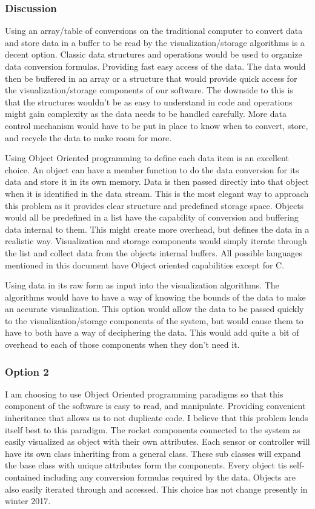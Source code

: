 \documentclass[10pt,draftclsnofoot,onecolumn]{IEEEtran}
\begin{document}
\subsubsection{Discussion}
Using an array/table of conversions on the traditional computer to convert data and store data in a buffer to be read by the visualization/storage algorithms is a decent option. Classic data structures and operations would be used to organize data conversion formulas. Providing fast easy access of the data. The data would then be buffered in an array or a structure that would provide quick access for the visualization/storage components of our software. The downside to this is that the structures wouldn't be as easy to understand in code and operations might gain complexity as the data needs to be handled carefully. More data control mechanism would have to be put in place to know when to convert, store, and recycle the data to make room for more.\par
	 Using Object Oriented programming to define each data item is an excellent choice. An object can have a member function to do the data conversion for its data and store it in its own memory. Data is then passed directly into that object when it is identified in the data stream. This is the most elegant way to approach this problem as it provides clear structure and predefined storage space. Objects would all be predefined in a list have the capability of conversion and buffering data internal to them. This might create more overhead, but defines the data in a realistic way. Visualization and storage components would simply iterate through the list and collect data from the objects internal buffers. All possible languages mentioned in this document have Object oriented capabilities except for C. \par
	 Using data in its raw form as input into the visualization algorithms. The algorithms would have to have a way of knowing the bounds of the data to make an accurate visualization. This option would allow the data to be passed quickly to the visualization/storage components of the system, but would cause them to have to both have a way of deciphering the data. This would add quite a bit of overhead to each of those components when they don't need it. \\

\subsubsection{Option 2}
I am choosing to use Object Oriented programming paradigms so that this component of the software is easy to read, and manipulate. Providing convenient inheritance that allows us to not duplicate code. I believe that this problem lends itself best to this paradigm. The rocket components connected to the system as easily visualized as object with their own attributes. Each sensor or controller will have its own class inheriting from a general class. These sub classes will expand the base class with unique attributes form the components. Every object tis self-contained including any conversion formulas required by the data. Objects are also easily iterated through and accessed. This choice has not change presently in winter 2017.
\end{document}
